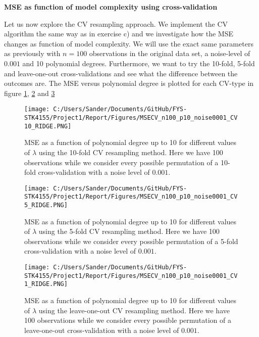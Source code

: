 \documentclass[12pt,a4paper]{article}
\begin{document}
\begin{center}
\large{\textbf{MSE as function of model complexity using cross-validation}}
\end{center}

\noindent Let us now explore the CV resampling approach. We implement the CV algorithm the same way as in exercise c) and we investigate how the MSE changes as function of model complexity. We will use the exact same parameters as previously with $n = 100$ observations in the original data set, a noise-level of $0.001$ and 10 polynomial degrees. Furthermore, we want to try the 10-fold, 5-fold and leave-one-out cross-validations and see what the difference between the outcomes are. The MSE versus polynomial degree is plotted for each CV-type in figure \ref{fig:MSERidgeCV1}, \ref{fig:MSERidgeCV2} and \ref{fig:MSERidgeCV3}

\begin{figure}[H]
\centering
\texttt{[image: C:/Users/Sander/Documents/GitHub/FYS-STK4155/Project1/Report/Figures/MSECV\_n100\_p10\_noise0001\_CV10\_RIDGE.PNG]}
\caption{\label{fig:MSERidgeCV1} MSE as a function of polynomial degree up to 10 for different values of $\lambda$ using the 10-fold CV resampling method. Here we have 100 observations while we consider every possible permutation of a 10-fold cross-validation with a noise level of $0.001$.}
\end{figure}

\begin{figure}[H]
\centering
\texttt{[image: C:/Users/Sander/Documents/GitHub/FYS-STK4155/Project1/Report/Figures/MSECV\_n100\_p10\_noise0001\_CV5\_RIDGE.PNG]}
\caption{\label{fig:MSERidgeCV2} MSE as a function of polynomial degree up to 10 for different values of $\lambda$ using the 5-fold CV resampling method. Here we have 100 observations while we consider every possible permutation of a 5-fold cross-validation with a noise level of $0.001$.}
\end{figure}

\begin{figure}[H]
\centering
\texttt{[image: C:/Users/Sander/Documents/GitHub/FYS-STK4155/Project1/Report/Figures/MSECV\_n100\_p10\_noise0001\_CV1\_RIDGE.PNG]}
\caption{\label{fig:MSERidgeCV3} MSE as a function of polynomial degree up to 10 for different values of $\lambda$ using the leave-one-out CV resampling method. Here we have 100 observations while we consider every possible permutation of a leave-one-out cross-validation with a noise level of $0.001$.}
\end{figure}
\end{document}
